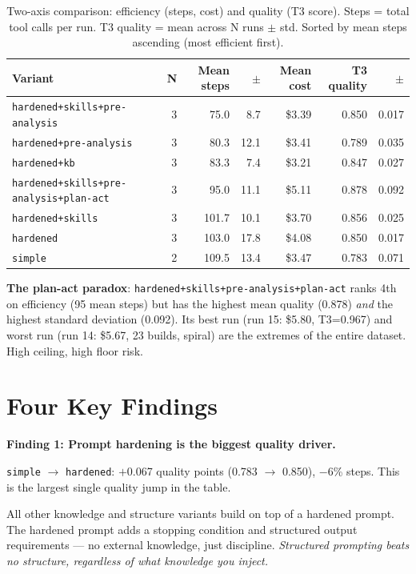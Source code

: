 \documentclass[11pt,a4paper]{article}
\begin{document}
\begin{table}[H]
\centering
\renewcommand{\arraystretch}{1.3}
\begin{tabular}{@{}lrrrrrr@{}}
\toprule
\textbf{Variant} & \textbf{N} & \textbf{Mean steps} & \textbf{$\pm$} &
  \textbf{Mean cost} & \textbf{T3 quality} & \textbf{$\pm$} \\
\midrule
\texttt{hardened+skills+pre-analysis}     & 3 &  75.0 & 8.7  & \$3.39 & 0.850 & 0.017 \\
\texttt{hardened+pre-analysis}            & 3 &  80.3 & 12.1 & \$3.41 & 0.789 & 0.035 \\
\texttt{hardened+kb}             & 3 &  83.3 & 7.4  & \$3.21 & 0.847 & 0.027 \\
\texttt{hardened+skills+pre-analysis+plan-act} & 3 & 95.0 & 11.1 & \$5.11 & 0.878 & 0.092 \\
\texttt{hardened+skills}         & 3 & 101.7 & 10.1 & \$3.70 & 0.856 & 0.025 \\
\texttt{hardened}                & 3 & 103.0 & 17.8 & \$4.08 & 0.850 & 0.017 \\
\texttt{simple}                  & 2 & 109.5 & 13.4 & \$3.47 & 0.783 & 0.071 \\
\bottomrule
\end{tabular}
\caption{Two-axis comparison: efficiency (steps, cost) and quality (T3 score).
         Steps = total tool calls per run. T3 quality = mean across N runs $\pm$ std.
         Sorted by mean steps ascending (most efficient first).}
\end{table}

\begin{warningbox}
\textbf{The plan-act paradox}: \texttt{hardened+skills+pre-analysis+plan-act} ranks 4th on efficiency
(95 mean steps) but has the highest mean quality (0.878) \emph{and} the highest standard
deviation (0.092). Its best run (run 15: \$5.80, T3=0.967) and worst run (run 14:
\$5.67, 23 builds, spiral) are the extremes of the entire dataset.
High ceiling, high floor risk.
\end{warningbox}

\section{Four Key Findings}

\begin{findingbox}
\textbf{Finding 1: Prompt hardening is the biggest quality driver.}

\texttt{simple} $\to$ \texttt{hardened}: $+$0.067 quality points (0.783 $\to$ 0.850),
$-$6\% steps. This is the largest single quality jump in the table.

All other knowledge and structure variants build on top of a hardened prompt.
The hardened prompt adds a stopping condition and structured output requirements ---
no external knowledge, just discipline.
\emph{Structured prompting beats no structure, regardless of what knowledge you inject.}
\end{findingbox}
\end{document}

